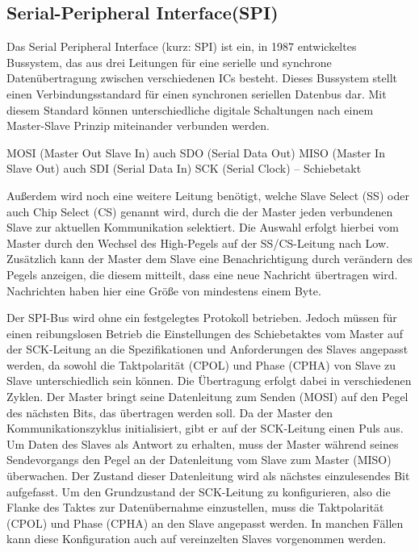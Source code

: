 \subsection{Serial-Peripheral Interface(SPI)} \label{grund-spi-subsubsec}


Das Serial Peripheral Interface (kurz: SPI) ist ein, in 1987 entwickeltes Bussystem, das aus drei Leitungen für eine serielle und synchrone Datenübertragung zwischen verschiedenen ICs besteht. Dieses Bussystem stellt einen Verbindungsstandard für einen synchronen seriellen Datenbus dar. Mit diesem Standard können unterschiedliche digitale Schaltungen nach einem Master-Slave Prinzip miteinander verbunden werden.

 MOSI (Master Out  Slave In) auch SDO (Serial Data Out)
 MISO (Master In   Slave Out) auch SDI (Serial Data In)
 SCK (Serial Clock) – Schiebetakt

Außerdem wird noch eine weitere Leitung benötigt, welche Slave Select (SS) oder auch
Chip Select (CS) genannt wird, durch die der Master jeden verbundenen Slave zur aktuellen
Kommunikation selektiert. Die Auswahl erfolgt hierbei vom Master durch den Wechsel des
High-Pegels auf der SS/CS-Leitung nach Low. Zusätzlich kann der Master dem Slave eine
Benachrichtigung durch verändern des Pegels anzeigen, die diesem mitteilt, dass eine neue
Nachricht übertragen wird. Nachrichten haben hier eine Größe von mindestens einem Byte.


Der SPI-Bus wird ohne ein festgelegtes Protokoll betrieben. Jedoch müssen für einen reibungslosen
Betrieb die Einstellungen des Schiebetaktes vom Master auf der SCK-Leitung an
die Spezifikationen und Anforderungen des Slaves angepasst werden, da sowohl die Taktpolarität
(CPOL) und Phase (CPHA) von Slave zu Slave unterschiedlich sein können. Die Übertragung erfolgt dabei in verschiedenen Zyklen. Der Master bringt seine Datenleitung zum Senden (MOSI) auf den Pegel des nächsten Bits, das übertragen werden soll. Da der Master den Kommunikationszyklus initialisiert, gibt er auf der SCK-Leitung einen Puls aus. Um Daten des Slaves als Antwort zu erhalten, muss der Master während seines Sendevorgangs den
Pegel an der Datenleitung vom Slave zum Master (MISO) überwachen. Der Zustand dieser
Datenleitung wird als nächstes einzulesendes Bit aufgefasst. Um den Grundzustand der SCK-Leitung zu konfigurieren, also die Flanke des Taktes zur Datenübernahme einzustellen, muss die Taktpolarität (CPOL) und Phase (CPHA) an den Slave angepasst werden. In manchen Fällen kann diese Konfiguration auch auf vereinzelten Slaves vorgenommen werden.

